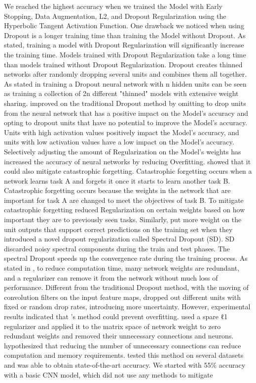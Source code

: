 \documentclass[oneside,12pt,article]{article}
\begin{document}
We reached the highest accuracy when we trained the Model with Early Stopping, Data Augmentation, L2, and Dropout Regularization using the Hyperbolic Tangent Activation Function. One drawback we noticed when using Dropout is a longer training time than training the Model without Dropout. As \cite{poernomo2018biased} stated, training a model with Dropout Regularization will significantly increase the training time. Models trained with Dropout Regularization take a long time than models trained without Dropout Regularization. Dropout creates thinned networks after randomly dropping several units and combines them all together. As stated in \cite{poernomo2018biased} training a Dropout neural network with n hidden units can be seen as training a collection of 2n different "thinned" models with extensive weight sharing. \cite{poernomo2018biased} improved on the traditional Dropout method by omitting to drop units from the neural network that has a positive impact on the Model's accuracy and opting to dropout units that have no potential to improve the Model's accuracy. Units with high activation values positively impact the Model's accuracy, and units with low activation values have a low impact on the Model's accuracy. Selectively adjusting the amount of Regularization on the Model's weights has increased the accuracy of neural networks by reducing Overfitting. \cite{ kirkpatrick2017overcoming} showed that it could also mitigate catastrophic forgetting. Catastrophic forgetting occurs when a network learns task A and forgets it once it starts to learn another task B. Catastrophic forgetting occurs because the weights in the network that are important for task A are changed to meet the objectives of task B. To mitigate catastrophic forgetting \cite{ kirkpatrick2017overcoming} reduced Regularization on certain weights based on how important they are to previously seen tasks. Similarly, \cite{khan2019regularization} put more weight on the unit outputs that support correct predictions on the training set when they introduced a novel dropout regularization called Spectral Dropout (SD). SD discarded noisy spectral components during the train and test phases. The spectral Dropout speeds up the convergence rate during the training process. As stated in \cite{ma2019transformed}, to reduce computation time, many network weights are redundant, and a regularizer can remove it from the network without much loss of performance. Different from the traditional Dropout method, with the moving of convolution filters on the input feature maps, \cite{pan2020dropfilterr} dropped out different units with fixed or random drop rates, introducing more uncertainty. However, experimental results indicated that \cite{pan2020dropfilterr}’s method could prevent overfitting. \cite{ma2019transformed} used a spare ℓ1 regularizer and applied it to the matrix space of network weight to zero redundant weights and removed their unnecessary connections and neurons. \cite{ma2019transformed} hypothesized that reducing the number of unnecessary connections can reduce computation and memory requirements. \cite{ kirkpatrick2017overcoming} tested this method on several datasets and was able to obtain state-of-the-art accuracy. We started with 55\% accuracy with a basic CNN model, which did not use any methods to mitigate 
\end{document}
